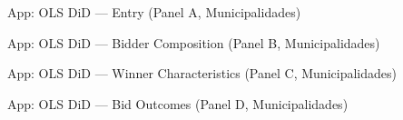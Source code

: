 \documentclass[9pt,aspectratio=169]{beamer}
\begin{document}

\begin{frame}{App: OLS DiD --- Entry (Panel A, Municipalidades)}
\small\medskip

\end{frame}

\begin{frame}{App: OLS DiD --- Bidder Composition (Panel B, Municipalidades)}
\small\medskip

\end{frame}

\begin{frame}{App: OLS DiD --- Winner Characteristics (Panel C, Municipalidades)}
\small\medskip

\end{frame}

\begin{frame}{App: OLS DiD --- Bid Outcomes (Panel D, Municipalidades)}
\small\medskip

\end{frame}







\end{document}
